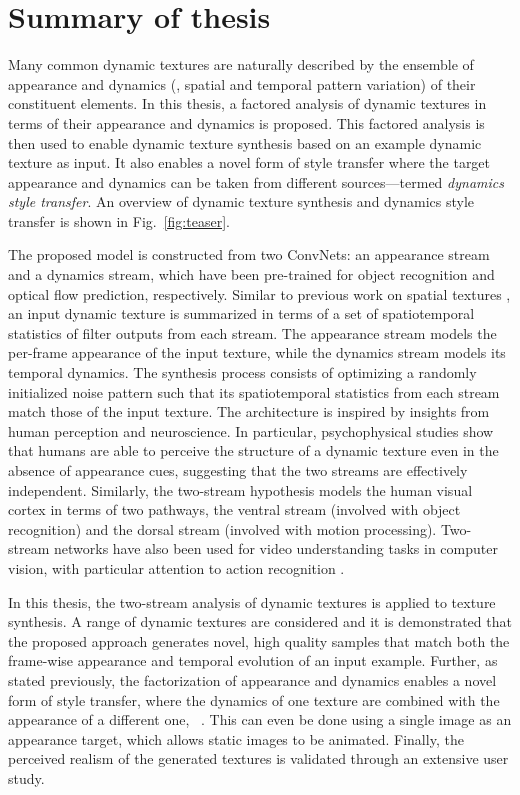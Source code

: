 \section{Summary of thesis}

Many common dynamic textures are naturally described by the ensemble of 
appearance and dynamics (\ie, spatial and temporal pattern variation) of their 
constituent elements. In this thesis, a factored analysis of dynamic 
textures in terms of their appearance and dynamics is proposed.
This factored analysis is then used to enable dynamic texture synthesis
based on an example dynamic texture as input.
It also enables a novel form of style transfer where the 
target appearance and dynamics can be taken from different sources---termed \emph{dynamics style transfer}.
An overview of dynamic texture synthesis and dynamics style transfer
is shown in Fig.\ \ref{fig:teaser}.
\clearpage

\clearpage
The proposed model is constructed from two ConvNets: an appearance stream and a dynamics stream,
which have been pre-trained for object recognition
and optical flow prediction, respectively.
Similar to previous work on spatial textures
\cite{gatys2015,heeger1995pyramid,portilla2000parametric}, an input dynamic texture is summarized in terms of a set of
spatiotemporal statistics of filter outputs from each stream.
The appearance stream models the per-frame appearance of
the input texture, while the dynamics stream models its
temporal dynamics.
The synthesis process consists of optimizing a randomly initialized noise pattern such that its spatiotemporal statistics from
each stream match those of the input texture.
The architecture is inspired by insights from human perception and 
neuroscience.
In particular, psychophysical studies \cite{cutting1982} show that
humans are able to perceive the structure of a dynamic texture even
in the absence of appearance cues, suggesting that the two streams
are effectively independent.
Similarly, the two-stream hypothesis \cite{goodale1992} models the 
human visual cortex in terms of two pathways, the ventral stream
(involved with object recognition) and the
dorsal stream (involved with motion processing). Two-stream networks have also been used for video understanding tasks in computer vision, with particular attention to action recognition \cite{simonyan2014,feichtenhofer2016two}.

In this thesis, the two-stream analysis of
dynamic textures is applied to texture synthesis.
A range of dynamic textures are considered and it is demonstrated that the 
proposed approach generates novel, high quality samples that match
both the frame-wise appearance and temporal evolution of an input
example.
Further, as stated previously, the factorization of appearance and dynamics enables a 
novel form of style transfer, where the dynamics of one texture are 
combined with the appearance of a different one,
\cf\ \cite{gatys2016image}.
This can even be done using a single image as an appearance
target, which allows static images to be animated.
Finally, the perceived realism of the generated textures is validated
through an extensive user study.


